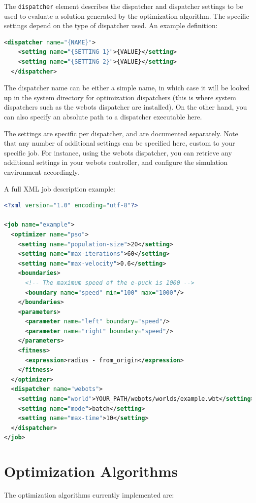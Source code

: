 \documentclass{report}
\begin{document}
The \verb!dispatcher! element describes the dispatcher and dispatcher settings
to be used to evaluate a solution generated by the optimization algorithm. The
specific settings depend on the type of dispatcher used. An example definition:

\begin{lstlisting}[language=xml]
  <dispatcher name="{NAME}">
    <setting name="{SETTING 1}">{VALUE}</setting>
    <setting name="{SETTING 2}">{VALUE}</setting>
  </dispatcher>
\end{lstlisting}

The dispatcher name can be either a simple name, in which case it will be
looked up in the system directory for optimization dispatchers (this is where
system dispatchers such as the webots dispatcher are installed). On the other
hand, you can also specify an absolute path to a dispatcher executable here.

The settings are specific per dispatcher, and are documented separately. Note
that any number of additional settings can be specified here, custom to your
specific job. For instance, using the webots dispatcher, you can retrieve any
additional settings in your webots controller, and configure the simulation
environment accordingly.

\newpage
A full XML job description example:

\begin{lstlisting}[language=xml]
<?xml version="1.0" encoding="utf-8"?>

<job name="example">
  <optimizer name="pso">
    <setting name="population-size">20</setting>
    <setting name="max-iterations">60</setting>
    <setting name="max-velocity">0.6</setting>
    <boundaries>
      <!-- The maximum speed of the e-puck is 1000 -->
      <boundary name="speed" min="100" max="1000"/>
    </boundaries>
    <parameters>
      <parameter name="left" boundary="speed"/>
      <parameter name="right" boundary="speed"/>
    </parameters>
    <fitness>
      <expression>radius - from_origin</expression>
    </fitness>
  </optimizer>
  <dispatcher name="webots">
    <setting name="world">YOUR_PATH/webots/worlds/example.wbt</setting>
    <setting name="mode">batch</setting>
    <setting name="max-time">10</setting>
  </dispatcher>
</job>
\end{lstlisting}

\section{Optimization Algorithms}
The optimization algorithms currently implemented are:
\end{document}
